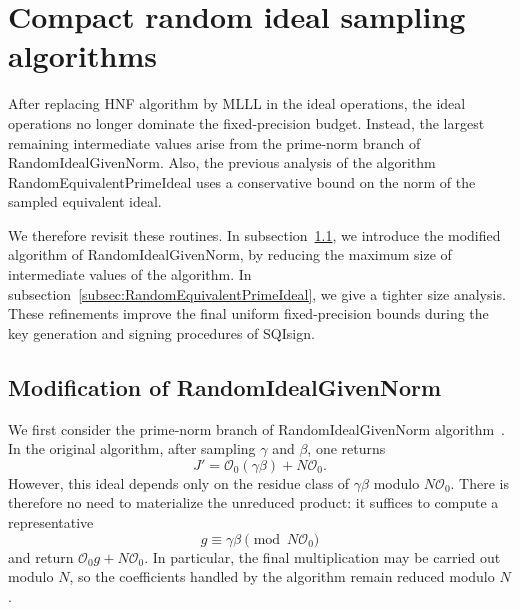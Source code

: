 \section{Compact random ideal sampling algorithms}
\label{sec:sampling}

After replacing HNF algorithm by \textsf{MLLL} in the ideal operations,
the ideal operations no longer dominate the fixed-precision budget.
Instead, the largest remaining intermediate values arise from the prime-norm branch of \textsf{RandomIdealGivenNorm}.
Also, the previous analysis of the algorithm \textsf{RandomEquivalentPrimeIdeal} uses a conservative bound on the norm of the sampled equivalent ideal.

We therefore revisit these routines.
In subsection~\ref{subsec:RandomIdealGivenNorm}, we introduce the modified algorithm of \textsf{RandomIdealGivenNorm}, by reducing the maximum size of intermediate values of the algorithm.
In subsection~\ref{subsec:RandomEquivalentPrimeIdeal}, we give a tighter size analysis.
These refinements improve the final
uniform fixed-precision bounds during the key generation and signing procedures of SQIsign.



\subsection{Modification of RandomIdealGivenNorm}
\label{subsec:RandomIdealGivenNorm}

We first consider the prime-norm branch of \textsf{RandomIdealGivenNorm} algorithm~\cite{AAA+25}. In the original algorithm, after sampling $\gamma$ and $\beta$, one returns
\[
J'=\mathcal O_0(\gamma\beta)+N\mathcal O_0.
\]
However, this ideal depends only on the residue class of $\gamma\beta$ modulo $N\mathcal O_0$. There is therefore no need to materialize the unreduced product: it suffices to compute a representative
\[
g \equiv \gamma\beta \pmod{N\mathcal O_0}
\]
and return $\mathcal O_0 g + N\mathcal O_0$. In particular, the final multiplication may be carried out modulo $N$, so the coefficients handled by the algorithm remain reduced modulo $N$.

